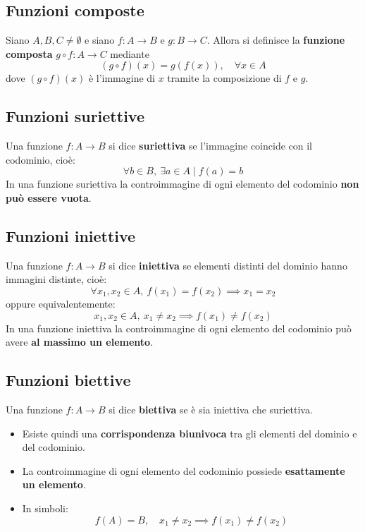 \documentclass[oneside,10pt]{book} %
\begin{document}
\subsection{Funzioni composte}
Siano $A, B, C \ne \emptyset$ e siano $f: A \to B$ e $g: B \to C$.
Allora si definisce la \textbf{funzione composta} $g \circ f: A \to C$ mediante
\[
(g \circ f)(x) = g(f(x)), \quad \forall x \in A
\]
dove $(g \circ f)(x)$ è l'immagine di $x$ tramite la composizione di $f$ e $g$.


\subsection{Funzioni suriettive}
Una funzione $f: A \to B$ si dice \textbf{suriettiva} se l'immagine coincide con il codominio, cioè:
\[
\forall b \in B, \ \exists a \in A \mid f(a) = b
\]
In una funzione suriettiva la controimmagine di ogni elemento del codominio \textbf{non può essere vuota}.

\subsection{Funzioni iniettive}
Una funzione $f: A \to B$ si dice \textbf{iniettiva} se elementi distinti del dominio hanno immagini distinte, cioè:
\[
\forall x_1, x_2 \in A, \ f(x_1) = f(x_2) \implies x_1 = x_2
\]
oppure equivalentemente:
\[
x_1, x_2 \in A, \ x_1 \ne x_2 \implies f(x_1) \ne f(x_2)
\]
In una funzione iniettiva la controimmagine di ogni elemento del codominio può avere \textbf{al massimo un elemento}.

\subsection{Funzioni biettive}
Una funzione $f: A \to B$ si dice \textbf{biettiva} se è sia iniettiva che suriettiva.
\begin{itemize}
    \item Esiste quindi una \textbf{corrispondenza biunivoca} tra gli elementi del dominio e del codominio.
    \item La controimmagine di ogni elemento del codominio possiede \textbf{esattamente un elemento}.
    \item In simboli:
    \[
    f(A) = B, \quad x_1 \ne x_2 \implies f(x_1) \ne f(x_2)
    \]
\end{itemize}
\end{document}
